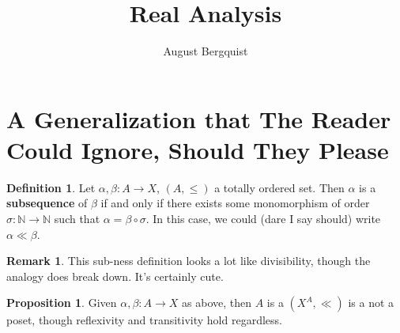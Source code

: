 \documentclass[11pt]{article}
\title{Real Analysis}
\author{August Bergquist}
\newcommand{\N}{\mathbb{N}}
\theoremstyle{definition}
\newtheorem*{definition}{Definition}
\newtheorem{proposition}{Proposition}
\newtheorem{remark}{Remark}
\begin{document}
\maketitle

\section{A Generalization that The Reader Could Ignore, Should They Please}

\begin{definition}
Let $\alpha,\beta:A\to X$, $(A, \le)$ a totally ordered set. Then $\alpha$ is a \textbf{subsequence} of $\beta$ if and only if there exists some monomorphism of order $\sigma:\N\to\N$ such that $\alpha = \beta\circ \sigma$. In this case, we could (dare I say should) write 
$\alpha \ll \beta$. 
\end{definition}

\begin{remark}
This sub-ness definition looks a lot like divisibility, though the analogy does break down. It's certainly cute.
\end{remark}

\begin{proposition}
Given $\alpha,\beta:A\to X$ as above, then $A$ is a $(X^A,\ll)$ is a not a poset, though reflexivity and transitivity hold regardless.
\end{proposition}
\end{document}
